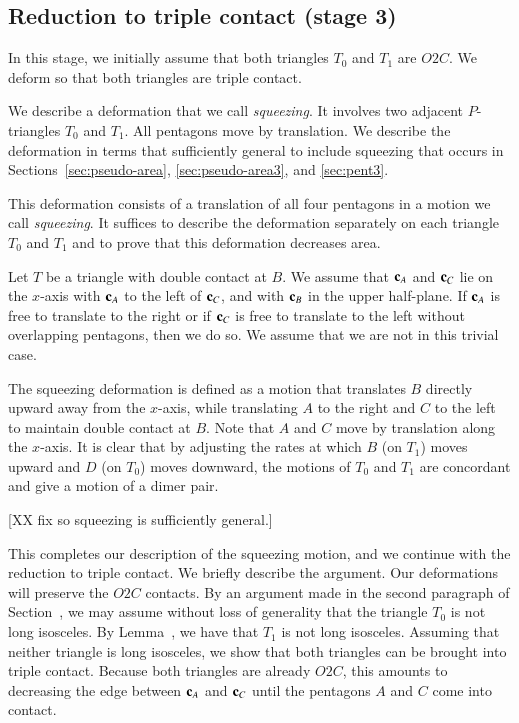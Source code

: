 \subsection{Reduction to triple contact (stage 3)}

In this stage, we initially assume that both triangles $T_0$ and $T_1$
are $O2C$.  We deform so that both triangles are triple contact.

We describe a deformation that we call \emph{squeezing}.  It involves
two adjacent $P$-triangles $T_0$ and $T_1$.  All pentagons move by
translation.  We describe the deformation in terms that sufficiently
general to include squeezing that occurs in
Sections~\ref{sec:pseudo-area}, \ref{sec:pseudo-area3},
and \ref{sec:pent3}.

This deformation consists of a translation of all four
pentagons in a motion we call {\it squeezing}.  It suffices to
describe the deformation separately on each triangle $T_0$ and $T_1$
and to prove that this deformation decreases area.

Let $T$ be a triangle with double contact at $B$.  We assume that
${\mathbf c}_A$ and ${\mathbf c}_C$ lie on the $x$-axis with ${\mathbf c}_A$ to the left of
${\mathbf c}_C$, and with ${\mathbf c}_B$ in the upper half-plane.  If ${\mathbf c}_A$ is free to
translate to the right or if ${\mathbf c}_C$ is free to translate to the left
without overlapping pentagons, then we do so.  We assume that we are
not in this trivial case.

The squeezing deformation is defined as a motion that translates $B$
directly upward away from the $x$-axis, while translating $A$ to the
right and $C$ to the left to maintain double contact at $B$.  Note
that $A$ and $C$ move by translation along the $x$-axis.  It is clear
that by adjusting the rates at which $B$ (on $T_1$) moves upward and
$D$ (on $T_0$) moves downward, the motions of $T_0$ and $T_1$ are
concordant and give a motion of a dimer pair. 

[XX fix so squeezing is sufficiently general.]


This completes our description of the squeezing motion, and we continue
with the reduction to triple contact.
We briefly describe the argument.  Our deformations will preserve the
$O2C$ contacts.  By an argument made in the second paragraph of
Section~, we may assume without loss of generality that
the triangle $T_0$ is not long isosceles.  By
Lemma~, we have that $T_1$ is not long
isosceles.  Assuming that neither triangle is long isosceles, we show
that both triangles can be brought into triple contact.  Because both
triangles are already $O2C$, this amounts to decreasing the edge
between ${\mathbf c}_A$ and ${\mathbf c}_C$ until the pentagons $A$ and $C$ come into
contact.  

